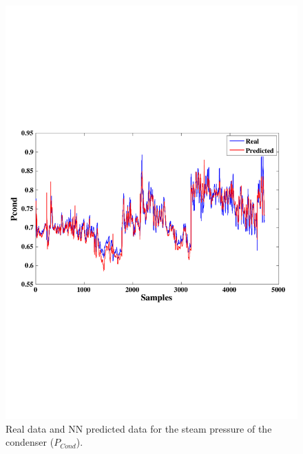 \begin{figure}
\centering
\includegraphics[width=1\textwidth]{ANN-STcond.pdf}
\caption{Real data and NN predicted data for the steam pressure of the condenser  ($P_{Cond}$).}
\label{Pcond}
\end{figure}

